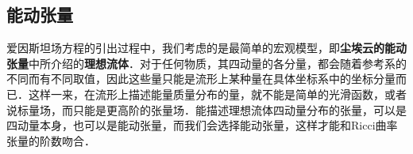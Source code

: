 

\subsection{能动张量}

爱因斯坦场方程的引出过程中，我们考虑的是最简单的宏观模型，即\textbf{尘埃云的能动张量}中所介绍的\textbf{理想流体}．对于任何物质，其四动量的各分量，都会随着参考系的不同而有不同取值，因此这些量只能是流形上某种量在具体坐标系中的坐标分量而已．这样一来，在流形上描述能量质量分布的量，就不能是简单的光滑函数，或者说标量场，而只能是更高阶的张量场．能描述理想流体四动量分布的张量，可以是四动量本身，也可以是能动张量，而我们会选择能动张量，这样才能和Ricci曲率张量的阶数吻合．








